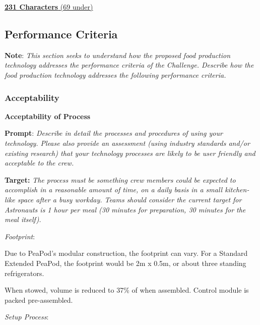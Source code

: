 \documentclass{report}
\begin{document}
\uline{\textbf{231 Characters} (69 under)}

\subsection{Performance Criteria}

\textbf{Note}: \textit{This section seeks to understand how the proposed food production technology addresses the performance criteria of the Challenge. Describe how the food production technology addresses the following performance criteria.}

\subsubsection{Acceptability}
\label{sec:acceptability}

\textbf{Acceptability of Process}
\label{sec:acceptability-process}

\textbf{Prompt}: \textit{Describe in detail the processes and procedures of using your technology. Please also provide an assessment (using industry standards and/or existing research) that your technology processes are likely to be user friendly and acceptable to the crew.}

\textbf{Target:} \textit{The process must be something crew members could be expected to accomplish in a reasonable amount of time, on a daily basis in a small kitchen-like space after a busy workday. Teams should consider the current target for Astronauts is 1 hour per meal (30 minutes for preparation, 30 minutes for the meal itself).}


\textit{Footprint}:

Due to PeaPod's modular construction, the footprint can vary. For a Standard Extended PeaPod, the footprint would be 2m x 0.5m, or about three standing refrigerators.

When stowed, volume is reduced to 37\% of when assembled. Control module is packed pre-assembled.

\textit{Setup Process}:
\end{document}
